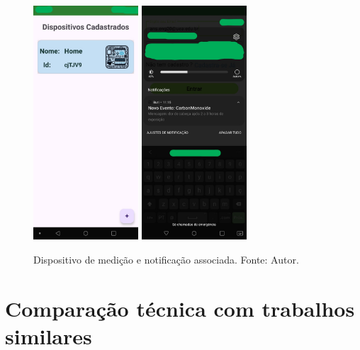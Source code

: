\begin{figure}[ht]
    \centering
    \includegraphics[width=0.35\textwidth]{img/alerta/dispositivo.jpg}
    \includegraphics[width=0.35\textwidth]{img/alerta/notificação.jpg}
    \caption{Dispositivo de medição e notificação associada. Fonte: Autor.}\label{figNotification}
\end{figure}

\section{Comparação técnica com trabalhos similares}\label{comparacao}

